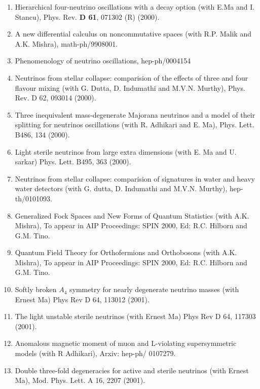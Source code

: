 \begin{enumerate}
\item Hierarchical four-neutrino oscillations with a decay option (with
E.Ma and I. Stancu), Phys. Rev. {\bf D 61}, 071302 (R) (2000).

\item A new differential calculus on noncommutative spaces (wi\-th R.P.
Malik and A.K. Mishra), math-ph/9908001.

\item Phenomenology of neutrino oscillations, hep-ph/0004154

\item Neutrinos from stellar collapse: comparision of the effects of three and four flavour mixing (with G. Dutta, D. Indumathi and M.V.N. Murthy), Phys. Rev. D 62, 093014 (2000).

\item Three inequivalent mass-degenerate Majorana neutrinos and a model of their splitting for neutrinos oscillations (with R. Adhikari and E. Ma), Phys. Lett. B486, 134 (2000).

\item Light sterile neutrinos from large extra dimensions (with E. Ma and U. sarkar) Phys. Lett. B495, 363 (2000).

\item Neutrinos from stellar collapse: comparision of signatures in water and heavy water detectors (with G. dutta, D. Indumathi and M.V.N. Murthy), hep-th/0101093.

\item Generalized Fock Spaces and New Forms of Quantum Statistics (with A.K. Mishra), To appear in AIP Proceedings: SPIN 2000, Ed: R.C. Hilborn and G.M. Tino.

\item Quantum Field Theory for Orthofermions and Orthobo\-sons (with A.K. Mishra), To appear in AIP Proceedings: SPIN 2000, Ed: R.C. Hilborn and G.M. Tino.

\item Softly broken $A_4$ symmetry for nearly degenerate neutrino masses (with Ernest Ma) Phys Rev D 64, 113012 (2001).

\item The light unstable sterile neutrinos (with Ernest Ma) Phys Rev D 64, 117303 (2001).

\item Anomalous magnetic moment of muon and L-violating supersymmetric models (with R Adhikari), Arxiv: hep-ph/ 0107279.

\item Double three-fold degeneracies for active and sterile neutrinos (with Ernest Ma), Mod. Phys. Lett. A 16, 2207 (2001).


\end{enumerate}
